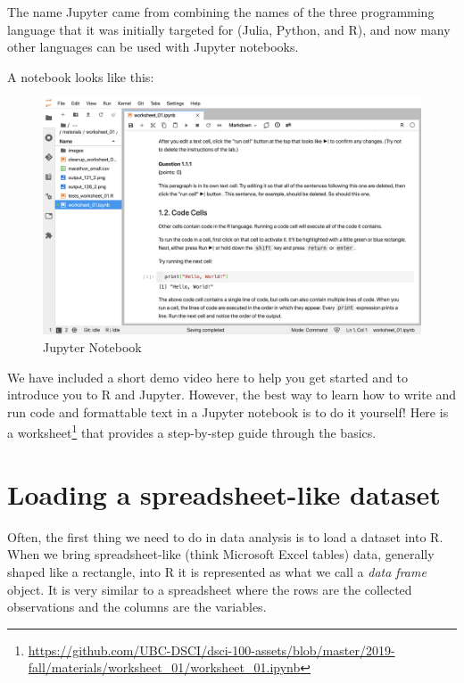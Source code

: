 \documentclass[
]{krantz}
\renewcommand{\href}[2]{#2\footnote{\url{#1}}}
\begin{document}
The name Jupyter came from combining the names of the three programming language that it was initially targeted for (Julia, Python, and R), and now many other languages can be used with Jupyter notebooks.

A notebook looks like this:

\begin{figure}
\includegraphics[width=1\linewidth]{img/jupyter} \caption{Jupyter Notebook}\label{fig:img-jupyter}
\end{figure}

We have included a short demo video here to help you get started and to introduce you to R and Jupyter.
However, the best way to learn how to write and run code and formattable text in a Jupyter notebook is to do it yourself! \href{https://github.com/UBC-DSCI/dsci-100-assets/blob/master/2019-fall/materials/worksheet_01/worksheet_01.ipynb}{Here is a worksheet} that provides a step-by-step guide through the basics.

\hypertarget{loading-a-spreadsheet-like-dataset}{%
\section{Loading a spreadsheet-like dataset}\label{loading-a-spreadsheet-like-dataset}}

Often, the first thing we need to do in data analysis is to load a dataset into R. When we bring spreadsheet-like (think Microsoft Excel tables) data, generally shaped like a rectangle, into R it is represented as what we call a \emph{data frame} object. It is very similar to a spreadsheet where the rows are the collected observations and the columns are the variables.
\end{document}
